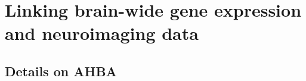 \chapter{Linking brain-wide gene expression and neuroimaging data}

\section{Details on AHBA}
\label{app:AppendixCh4_1}

